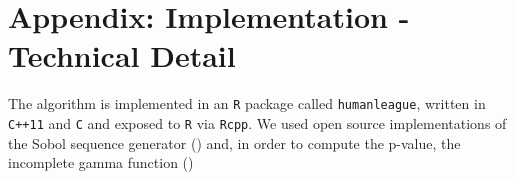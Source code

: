\documentclass{JASSS}
\begin{document}






\endparano




\section{Appendix: Implementation - Technical Detail} 
The algorithm is implemented in an \texttt{R} package called
\texttt{humanleague}, written in \texttt{C++11} and \texttt{C} and
exposed to \texttt{R} via \texttt{Rcpp}. We used open source
implementations of the Sobol sequence generator (\cite{johnson_stevengj/nlopt:_nodate}) and, in order to 
compute the p-value, the
incomplete gamma function (\cite{burkardt_asa032_2008})
\end{document}
